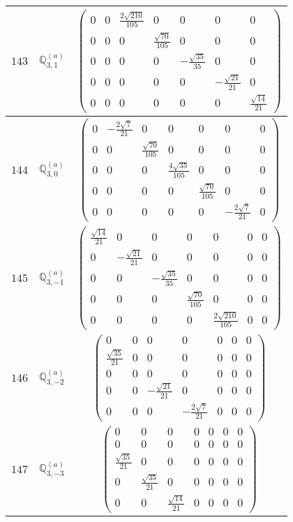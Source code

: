 \documentclass[fleqn,8pt,landscape]{jsarticle}
\begin{document}
\begin{center}
\begin{longtable}{ccc}
$ 143 $ & $ \mathbb{Q}_{3,1}^{(a)} $ & $ \begin{pmatrix} 0 & 0 & \frac{2 \sqrt{210}}{105} & 0 & 0 & 0 & 0 \\ 0 & 0 & 0 & \frac{\sqrt{70}}{105} & 0 & 0 & 0 \\ 0 & 0 & 0 & 0 & - \frac{\sqrt{35}}{35} & 0 & 0 \\ 0 & 0 & 0 & 0 & 0 & - \frac{\sqrt{21}}{21} & 0 \\ 0 & 0 & 0 & 0 & 0 & 0 & \frac{\sqrt{14}}{21} \end{pmatrix} $ \\ \hline
$ 144 $ & $ \mathbb{Q}_{3,0}^{(a)} $ & $ \begin{pmatrix} 0 & - \frac{2 \sqrt{7}}{21} & 0 & 0 & 0 & 0 & 0 \\ 0 & 0 & \frac{\sqrt{70}}{105} & 0 & 0 & 0 & 0 \\ 0 & 0 & 0 & \frac{4 \sqrt{35}}{105} & 0 & 0 & 0 \\ 0 & 0 & 0 & 0 & \frac{\sqrt{70}}{105} & 0 & 0 \\ 0 & 0 & 0 & 0 & 0 & - \frac{2 \sqrt{7}}{21} & 0 \end{pmatrix} $ \\ \hline
$ 145 $ & $ \mathbb{Q}_{3,-1}^{(a)} $ & $ \begin{pmatrix} \frac{\sqrt{14}}{21} & 0 & 0 & 0 & 0 & 0 & 0 \\ 0 & - \frac{\sqrt{21}}{21} & 0 & 0 & 0 & 0 & 0 \\ 0 & 0 & - \frac{\sqrt{35}}{35} & 0 & 0 & 0 & 0 \\ 0 & 0 & 0 & \frac{\sqrt{70}}{105} & 0 & 0 & 0 \\ 0 & 0 & 0 & 0 & \frac{2 \sqrt{210}}{105} & 0 & 0 \end{pmatrix} $ \\ \hline
$ 146 $ & $ \mathbb{Q}_{3,-2}^{(a)} $ & $ \begin{pmatrix} 0 & 0 & 0 & 0 & 0 & 0 & 0 \\ \frac{\sqrt{35}}{21} & 0 & 0 & 0 & 0 & 0 & 0 \\ 0 & 0 & 0 & 0 & 0 & 0 & 0 \\ 0 & 0 & - \frac{\sqrt{21}}{21} & 0 & 0 & 0 & 0 \\ 0 & 0 & 0 & - \frac{2 \sqrt{7}}{21} & 0 & 0 & 0 \end{pmatrix} $ \\ \hline
$ 147 $ & $ \mathbb{Q}_{3,-3}^{(a)} $ & $ \begin{pmatrix} 0 & 0 & 0 & 0 & 0 & 0 & 0 \\ 0 & 0 & 0 & 0 & 0 & 0 & 0 \\ \frac{\sqrt{35}}{21} & 0 & 0 & 0 & 0 & 0 & 0 \\ 0 & \frac{\sqrt{35}}{21} & 0 & 0 & 0 & 0 & 0 \\ 0 & 0 & \frac{\sqrt{14}}{21} & 0 & 0 & 0 & 0 \end{pmatrix} $ \\ \hline

\end{longtable}
\end{center}
\end{document}
